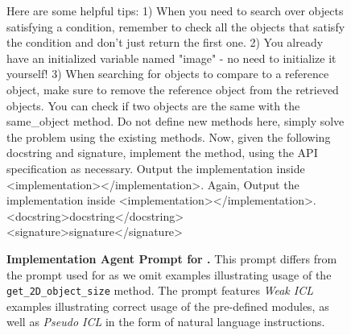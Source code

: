 \begin{figure*}[t]
\begin{psmall}
Here are some helpful tips: 
1) When you need to search over objects satisfying a condition, remember to check all the objects that satisfy the condition and don't just return the first one. 
2) You already have an initialized variable named "image" - no need to initialize it yourself! 
3) When searching for objects to compare to a reference object, make sure to remove the reference object from the retrieved objects. You can check if two objects are the same with the same_object method.
Do not define new methods here, simply solve the problem using the existing methods.
Now, given the following docstring and signature, implement the method, using the API specification as necessary. Output the implementation inside <implementation></implementation>.
Again, Output the implementation inside <implementation></implementation>.
<docstring>{docstring}</docstring>
<signature>{signature}</signature>
\end{psmall}
\caption{\textbf{Implementation Agent Prompt for \clevr.} This prompt differs from the prompt used for \ourbench as we omit examples illustrating usage of the \texttt{get\_2D\_object\_size} method. The prompt features \emph{Weak ICL} examples illustrating correct usage of the pre-defined modules, as well as \emph{Pseudo ICL} in the form of natural language instructions.}
\label{fig:implementation_prompt_clevr}
\end{figure*}